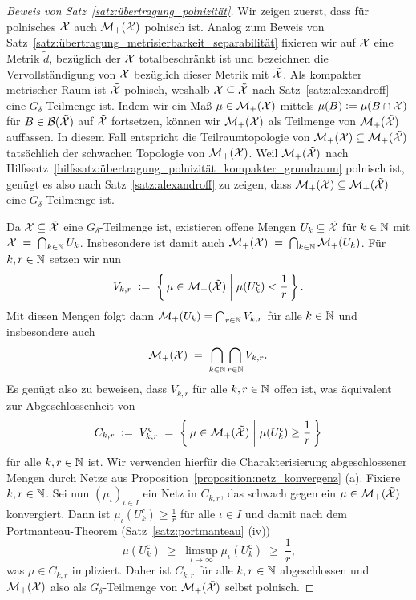 \documentclass[../thesis/thesis.tex]{subfiles}
\begin{document}
	\begin{proof}[Beweis von Satz~\ref{satz:übertragung_polnizität}]
		Wir zeigen zuerst, dass für polnisches $\mathcal{X}$ auch $\mathcal{M}_{+}(\mathcal{X})$ polnisch ist. Analog zum Beweis von Satz~\ref{satz:übertragung_metrisierbarkeit_separabilität} fixieren wir auf 
		$\mathcal{X}$ eine Metrik $\tilde{d}$, bezüglich der $\mathcal{X}$ totalbeschränkt ist und
		bezeichnen die Vervollständigung von $\mathcal{X}$ bezüglich dieser Metrik mit $\tilde{\mathcal{X}}$. Als kompakter metrischer Raum ist $\tilde{\mathcal{X}}$ polnisch, weshalb $\mathcal{X} \subseteq \tilde{\mathcal{X}}$
		nach Satz~\ref{satz:alexandroff} eine $G_\delta$-Teilmenge ist. Indem wir ein Maß $\mu \in \mathcal{M}_{+}(\mathcal{X})$ mittels 
		$\mu(B) \vcentcolon = \mu(B \cap \mathcal{X})$ für $B \in \mathcal{B}(\tilde{\mathcal{X}})$ auf $\tilde{\mathcal{X}}$ fortsetzen, können wir $\mathcal{M}_{+}(\mathcal{X})$ als Teilmenge von $\mathcal{M}_{+}(\tilde{\mathcal{X}})$
		auffassen. In diesem Fall entspricht die Teilraumtopologie von $\mathcal{M}_{+}(\mathcal{X}) \subseteq \mathcal{M}_{+}(\tilde{\mathcal{X}})$ tatsächlich der schwachen Topologie von $\mathcal{M}_{+}(\mathcal{X})$. Weil $\mathcal{M}_{+}(\tilde{\mathcal{X}})$ nach 
		Hilfssatz~\ref{hilfssatz:übertragung_polnizität_kompakter_grundraum} polnisch ist, genügt es also nach Satz~\ref{satz:alexandroff} zu zeigen, 
		dass $\mathcal{M}_{+}(\mathcal{X}) \subseteq \mathcal{M}_{+}(\tilde{\mathcal{X}})$ eine $G_\delta$-Teilmenge ist.
		
		Da $\mathcal{X} \subseteq \tilde{\mathcal{X}}$ eine $G_\delta$-Teilmenge ist, existieren offene Mengen $U_k \subseteq \tilde{\mathcal{X}}$ für $k \in \mathbb{N}$ mit 
		$\mathcal{X} \; = \; \bigcap_{k \in \mathbb{N}} U_k$. Insbesondere ist damit auch
		$\mathcal{M}_{+}(\mathcal{X}) \; = \; \bigcap_{k \in \mathbb{N}} \mathcal{M}_{+}(U_k)$.
		Für $k, r \in \mathbb{N}$ setzen wir nun
		\[ V_{k, r} \; \vcentcolon = \; \left\{\, \mu \in \mathcal{M}_{+}(\tilde{\mathcal{X}}) \; \middle| \; \mu(U_k^{\mathsf{c}}) < \frac{1}{r} \,\right\} \text{.} \]
		Mit diesen Mengen folgt dann $\mathcal{M}_{+}(U_k) = \bigcap_{r \in \mathbb{N}} V_{k, r}$ für alle $k \in \mathbb{N}$ und insbesondere auch
		\[ \mathcal{M}_{+}(\mathcal{X}) \; = \; \bigcap_{k \in \mathbb{N}} \bigcap_{r \in \mathbb{N}} V_{k, r} \text{.} \]
		Es genügt also zu beweisen, dass $V_{k, r}$ für alle $k, r \in \mathbb{N}$ offen ist, was äquivalent zur Abgeschlossenheit von 
		\[C_{k, r} \; \vcentcolon = \; V_{k, r}^{\mathsf{c}} \; = \; \left\{\, \mu \in \mathcal{M}_{+}(\tilde{\mathcal{X}}) \; \middle| \; \mu(U_k^{\mathsf{c}}) \geq \frac{1}{r} \,\right\} \] 
		für alle $k, r \in \mathbb{N}$ ist. Wir verwenden hierfür die Charakterisierung abgeschlossener Mengen durch Netze aus Proposition~\ref{proposition:netz_konvergenz} (a).
		Fixiere $k, r \in \mathbb{N}$. Sei nun $(\mu_\iota)_{\iota \in I}$ ein Netz in $C_{k, r}$, das schwach gegen ein $\mu \in \mathcal{M}_{+}(\tilde{\mathcal{X}})$ konvergiert.
		Dann ist $\mu_\iota(U_k^{\mathsf{c}}) \geq \frac{1}{r}$ für alle $\iota \in I$ und damit nach dem Portmanteau-Theorem (Satz~\ref{satz:portmanteau} (iv))
		\[ \mu(U_k^{\mathsf{c}}) \; \geq \; \limsup_{\iota \to \infty} \mu_\iota(U_k^{\mathsf{c}}) \; \geq \; \frac{1}{r} \text{,} \]
		was $\mu \in C_{k, r}$ impliziert. Daher ist $C_{k, r}$ für alle $k, r \in \mathbb{N}$ abgeschlossen und $\mathcal{M}_{+}(\mathcal{X})$ also als $G_{\delta}$-Teilmenge von $\mathcal{M}_{+}(\tilde{\mathcal{X}})$ selbst polnisch.
		

\end{proof}
\end{document}
